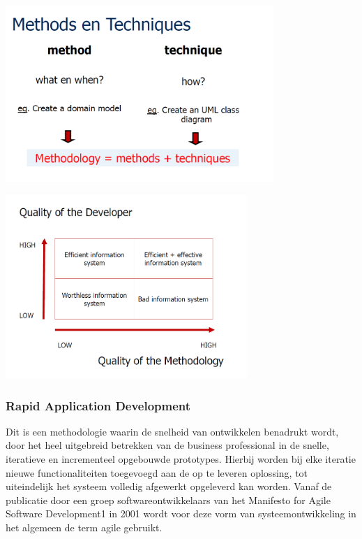 \begin{center}
\includegraphics[width=4in]{img/methodstechniques}%
\end{center}




\begin{center}
\includegraphics[width=3.6in]{img/quality}%
\end{center}

\subsubsection{Rapid Application Development}

Dit is een methodologie waarin de snelheid van ontwikkelen benadrukt wordt, door het heel uitgebreid betrekken van de business professional in de snelle, iteratieve en incrementeel opgebouwde prototypes. Hierbij worden bij elke iteratie nieuwe functionaliteiten toegevoegd aan de op te leveren oplossing, tot uiteindelijk het systeem volledig afgewerkt opgeleverd kan worden.
Vanaf de publicatie door een groep softwareontwikkelaars van het Manifesto for Agile Software Development1 in 2001 wordt voor deze vorm van systeemontwikkeling in het algemeen de term agile gebruikt.

